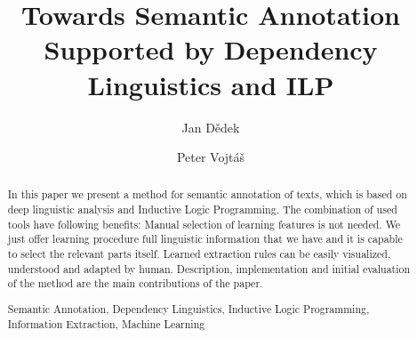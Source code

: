 \documentclass[runningheads,a4paper]{llncs}
\newcommand{\keywords}[1]{\par\addvspace\baselineskip
\noindent\keywordname\enspace\ignorespaces#1}
\begin{document}
\mainmatter  %

\title{Towards Semantic Annotation Supported by Dependency Linguistics and ILP}


%
%
\author{Jan D\v{e}dek
\and Peter Vojt\'{a}\v{s}}
%


%
%

\maketitle


\begin{abstract}
In this paper we present a method for semantic annotation of texts, which is based on deep linguistic analysis and Inductive Logic Programming. The combination of used tools have following benefits: Manual selection of learning features is not needed. We just offer learning procedure full linguistic information that we have and it is capable to select the relevant parts itself. Learned extraction rules can be easily visualized, understood and adapted by human.
Description, implementation and initial evaluation of the method are the main contributions of the paper.
\keywords{Semantic Annotation, Dependency Linguistics, Inductive Logic Programming, Information Extraction, Machine Learning}
\end{abstract}
\end{document}
